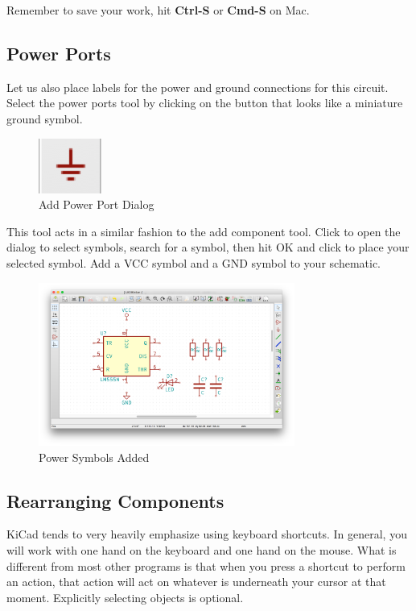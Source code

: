 \documentclass[12pt, oneside]{article}
\begin{document}
Remember to save your work, hit \textbf{Ctrl-S} or \textbf{Cmd-S} on Mac.

\subsection{Power Ports}
Let us also place labels for the power and ground connections for this circuit. Select the power ports tool by clicking on the button that looks like a miniature ground symbol.

\begin{figure}[H]
\includegraphics{PowerSymbol}
\centering
\caption{Add Power Port Dialog}
\end{figure}

This tool acts in a similar fashion to the add component tool. Click to open the dialog to select symbols, search for a symbol, then hit OK and click to place your selected symbol. Add a VCC symbol and a GND symbol to your schematic.

\begin{figure}[H]
\includegraphics[width=0.75\textwidth]{AddedPowerSymbols}
\centering
\caption{Power Symbols Added}
\end{figure}

\subsection{Rearranging Components}
KiCad tends to very heavily emphasize using keyboard shortcuts. In general, you will work with one hand on the keyboard and one hand on the mouse. What is different from most other programs is that when you press a shortcut to perform an action, that action will act on whatever is underneath your cursor at that moment. Explicitly selecting objects is optional.
\end{document}
